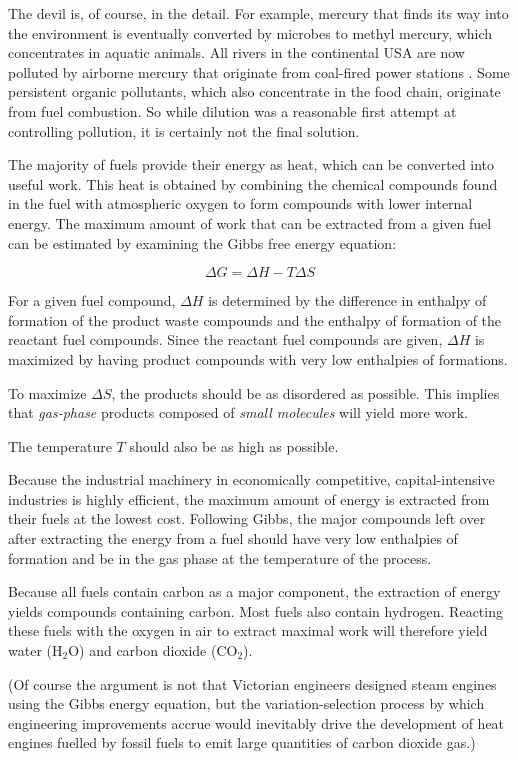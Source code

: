 The devil is, of course, in the detail. For example, mercury that finds its way
into the environment is eventually converted by microbes to methyl mercury,
which concentrates in aquatic animals. All rivers in the continental USA are now
polluted by airborne mercury that originate from coal-fired power stations
\autocite{Wentz2014}. Some persistent organic pollutants, which also concentrate
in the food chain, originate from fuel combustion. So while dilution was a
reasonable first attempt at controlling pollution, it is certainly not the final
solution.

The majority of fuels provide their energy as heat, which can be converted into
useful work. This heat is obtained by combining the chemical compounds found in
the fuel with atmospheric oxygen to form compounds with lower internal energy. The
maximum amount of work that can be extracted from a given fuel can be estimated
by examining the Gibbs free energy equation:

\[
	\Delta G = \Delta H - T \Delta S
\]

For a given fuel compound, \(\Delta H\) is determined by the difference
in enthalpy of formation of the product waste compounds and the enthalpy of
formation of the reactant fuel compounds. Since the reactant fuel compounds are
given, \(\Delta H\) is maximized by having product compounds with very low
enthalpies of formations.

To maximize \(\Delta S\), the products should be as disordered as possible. This
implies that \emph{gas-phase} products composed of \emph{small molecules} will
yield more work.

The temperature \(T\) should also be as high as possible.

Because the industrial machinery in economically competitive, capital-intensive
industries is highly efficient, the maximum amount of energy is extracted from
their fuels at the lowest cost. Following Gibbs, the major compounds left over
after extracting the energy from a fuel should have very low enthalpies of
formation and be in the gas phase at the temperature of the process. 

Because all fuels contain carbon as a major component, the extraction of energy
yields compounds containing carbon. Most fuels also contain hydrogen. Reacting
these fuels with the oxygen in air to extract maximal work will therefore
yield water (H$_2$O) and carbon dioxide (CO$_2$). 

(Of course the argument is not that Victorian engineers designed steam engines
using the Gibbs energy equation, but the variation-selection process
\autocite[Chapter 8]{Vincenti1990} by which engineering improvements accrue would
inevitably drive the development of heat engines fuelled by fossil fuels to emit
large quantities of carbon dioxide gas.)

